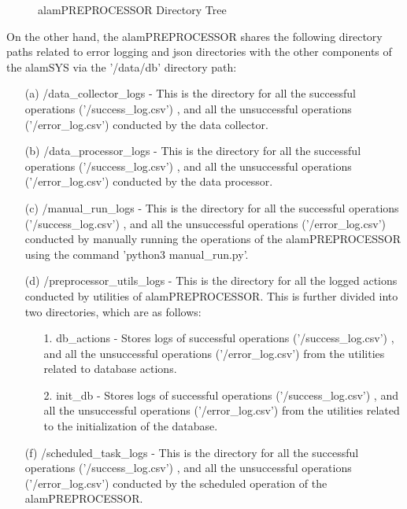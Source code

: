 \begin{figure}[ht]
    \caption{alamPREPROCESSOR Directory Tree}
    \label{fig:alampreproc_tree}
\end{figure}
\FloatBarrier

On the other hand, the alamPREPROCESSOR shares the following directory paths related to error 
logging and json directories with the other components of the alamSYS via the '/data/db' directory path:
\begin{itemize}
    \item[(a)] /data\_collector\_logs - This is the directory for all the successful operations ('/success\_log.csv')
    , and all the unsuccessful operations ('/error\_log.csv') conducted by the data collector.
    \item[(b)] /data\_processor\_logs - This is the directory for all the successful operations ('/success\_log.csv')
    , and all the unsuccessful operations ('/error\_log.csv') conducted by the data processor.
    \item[(c)] /manual\_run\_logs - This is the directory for all the successful operations ('/success\_log.csv')
    , and all the unsuccessful operations ('/error\_log.csv') conducted by manually running the operations of the 
    alamPREPROCESSOR using the command 'python3 manual\_run.py'.
    \item[(d)] /preprocessor\_utils\_logs - This is the directory for all the logged actions conducted by utilities of alamPREPROCESSOR. 
    This is further divided into two directories, which are as follows:
    \begin{itemize}
        \item[1.] db\_actions - Stores logs of successful operations ('/success\_log.csv')
        , and all the unsuccessful operations ('/error\_log.csv') from the utilities related
        to database actions.
        \item[2.] init\_db - Stores logs of successful operations ('/success\_log.csv')
        , and all the unsuccessful operations ('/error\_log.csv') from the utilities related
        to the initialization of the database.
    \end{itemize}
    \item[(f)] /scheduled\_task\_logs - This is the directory for all the successful operations ('/success\_log.csv')
    , and all the unsuccessful operations ('/error\_log.csv') conducted by the scheduled operation of the alamPREPROCESSOR.
\end{itemize}